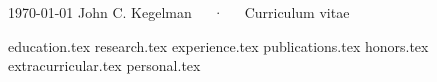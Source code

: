 \documentclass[11pt, letterpaper]{awesome-cv}
\newcommand*{\sectiondir}{cv/}
\begin{document}
\makecvheader%

\makecvfooter%
  {\today}
  {John C. Kegelman~~~·~~~Curriculum vitae}
  {\thepage}

{education.tex}
{research.tex}
{experience.tex}
{publications.tex}
{honors.tex}
{extracurricular.tex}
{personal.tex}
\end{document}

